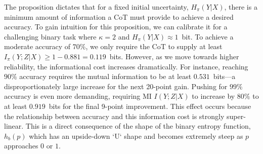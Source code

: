 \documentclass{article}
\theoremstyle{plain}
\begin{document}
The proposition dictates that for a fixed initial uncertainty, \(H_{\pi}(Y|X)\), there is a minimum amount of information a CoT must provide to achieve a desired accuracy.
To gain intuition for this proposition, we can calibrate it for a challenging binary task where \(\kappa=2\) and \(H_{\pi}(Y|X) \approx 1\)~bit.
To achieve a moderate accuracy of $70\%$, we only require the CoT to supply at least \(I_{\pi}(Y;Z|X) \ge 1 - 0.881 = 0.119\)~bits.
However, as we move towards higher reliability, the informational cost increases dramatically. For instance, reaching $90\%$ accuracy requires the mutual information to be at least $0.531$~bits---a disproportionately large increase for the next 20-point gain.
Pushing for $99\%$ accuracy is even more demanding, requiring MI $I(Y;Z|X)$ to increase by $80\%$ to at least $0.919$~bits for the final 9-point improvement. This effect occurs because the relationship between accuracy and this information cost is strongly super-linear.
This is a direct consequence of the shape of the binary entropy function, \(h_b(p)\) which has an upside-down `U` shape and becomes extremely steep as $p$ approaches $0$ or $1$.



\end{document}
